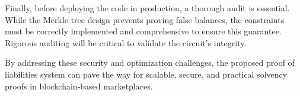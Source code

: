 Finally, before deploying the code in production, a thorough audit is essential. 
While the Merkle tree design prevents proving false balances, the constraints must be correctly implemented and comprehensive to ensure this guarantee. 
Rigorous auditing will be critical to validate the circuit's integrity.

By addressing these security and optimization challenges, the proposed proof of liabilities system can pave the way for scalable, 
secure, and practical solvency proofs in blockchain-based marketplaces.